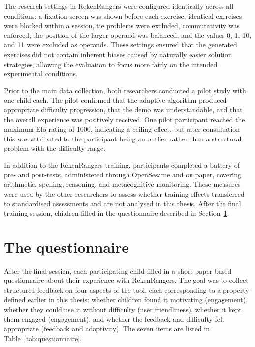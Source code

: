 The research settings in RekenRangers were configured identically across all conditions: a fixation screen was shown before each exercise, identical exercises were blocked within a session, tie problems were excluded, commutativity was enforced, the position of the larger operand was balanced, and the values 0, 1, 10, and 11 were excluded as operands. These settings ensured that the generated exercises did not contain inherent biases caused by naturally easier solution strategies, allowing the evaluation to focus more fairly on the intended experimental conditions.

Prior to the main data collection, both researchers conducted a pilot study with one child each. The pilot confirmed that the adaptive algorithm produced appropriate difficulty progression, that the demo was understandable, and that the overall experience was positively received. One pilot participant reached the maximum Elo rating of 1000, indicating a ceiling effect, but after consultation this was attributed to the participant being an outlier rather than a structural problem with the difficulty range.

In addition to the RekenRangers training, participants completed a battery of pre- and post-tests, administered through OpenSesame and on paper, covering arithmetic, spelling, reasoning, and metacognitive monitoring. These measures were used by the other researchers to assess whether training effects transferred to standardised assessments and are not analysed in this thesis. After the final training session, children filled in the questionnaire described in Section~\ref{sec:questionnaire}.

\section{The questionnaire}
\label{sec:questionnaire}
After the final session, each participating child filled in a short paper-based questionnaire about their experience with RekenRangers. The goal was to collect structured feedback on four aspects of the tool, each corresponding to a property defined earlier in this thesis: whether children found it motivating (engagement), whether they could use it without difficulty (user friendliness), whether it kept them engaged (engagement), and whether the feedback and difficulty felt appropriate (feedback and adaptivity). The seven items are listed in Table~\ref{tab:questionnaire}.

